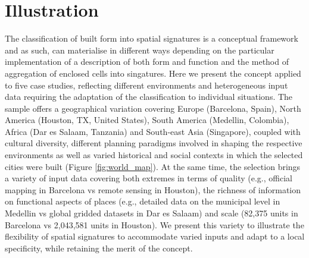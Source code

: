 \section{Illustration}
\label{sec:app}



The classification of built form into spatial signatures is a conceptual framework and
as such, can materialise in different ways depending on the particular implementation of
a description of both form and function and the method of aggregation of enclosed cells
into singatures.
Here we present the concept applied to five case studies, reflecting different
environments and heterogeneous input data requiring the adaptation of the classification
to individual situations.
The sample offers a geographical variation covering Europe (Barcelona, Spain), North
America (Houston, TX, United States), South America (Medellin, Colombia), Africa (Dar es
Salaam, Tanzania) and South-east Asia (Singapore),
coupled with cultural diversity, different planning paradigms involved in shaping the
respective environments as well as varied historical and social contexts in which the
selected cities were built (Figure \ref{fig:world_map}).
At the same time, the selection brings a variety of input data covering both extremes in
terms of quality (e.g., official mapping in Barcelona vs remote sensing in Houston), the
richness of information on functional aspects of places (e.g., detailed data on the
municipal level in Medellin vs global gridded datasets in Dar es Salaam) and scale
(82,375 units in Barcelona vs 2,043,581 units in Houston).
We present this variety to illustrate the flexibility of spatial signatures to
accommodate varied inputs and adapt to a local specificity, while retaining the merit of
the concept.

